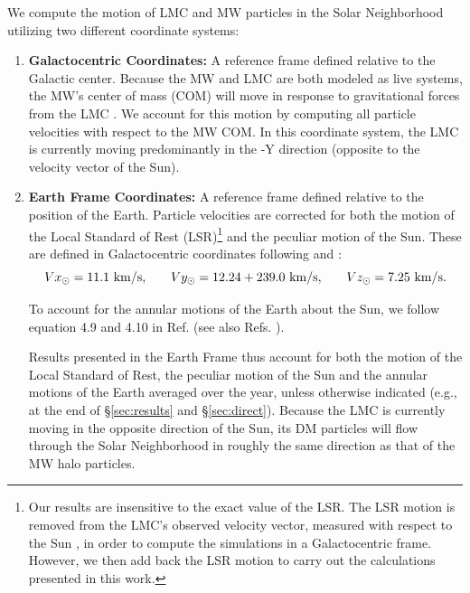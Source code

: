 \documentclass[letterpaper,11pt]{article}
\begin{document}
We compute the motion of LMC and MW particles in the Solar Neighborhood utilizing two different coordinate systems:

\begin{enumerate}
\item {\bf Galactocentric Coordinates:} A reference frame defined relative to the Galactic center. Because the MW and LMC are both 
modeled as live systems, the MW's center of mass (COM) will move in response to 
gravitational forces from the LMC \cite{Gomez:2015}.  We account for this motion by 
computing all particle velocities with respect to the MW COM. In this coordinate system, the 
LMC is currently moving predominantly in the -Y direction (opposite to 
the velocity vector of the Sun).


\item {\bf Earth Frame Coordinates:} A reference frame defined relative to the position of the Earth.   Particle velocities are corrected
for both the motion of the Local Standard of Rest (LSR)\footnote{Our
results are insensitive to the exact value of the LSR. The LSR motion is removed from the LMC's observed velocity vector, measured with respect to the Sun \citep{Kallivayalil:2013}, in order to compute the simulations in a Galactocentric frame. However, we then add back the LSR motion to carry out the calculations presented in this work. 
} and the peculiar motion of the Sun.
These are defined in Galactocentric coordinates following \citet{Schonrich:2010} and \citet{McMillan:2017}:
\begin{equation}
    Vx_\odot = 11.1 \, \, {\rm km/s,}
    \qquad 
    Vy_\odot = 12.24 + 239.0 \, \,{\rm km/s,}
    \qquad 
    Vz_\odot = 7.25\, \,{\rm km/s}.
\end{equation}

To account for the annular motions of the Earth 
about the Sun, we follow equation 4.9 and 4.10 
in Ref. \cite{Kelso:2016} (see also Refs. \cite{Green:2002a,Freese:2013}). 



Results presented in the Earth Frame thus account 
for both the motion of the Local Standard of Rest, the peculiar motion of the Sun and 
the annular motions of the Earth averaged over the year, unless 
otherwise indicated (e.g., at the end of \S\ref{sec:results} and \S\ref{sec:direct}).
Because the LMC is currently moving in the
opposite direction of the Sun, its DM 
particles will flow through the Solar Neighborhood 
in roughly the same direction as that of 
the MW halo particles.



\end{enumerate}
\end{document}
